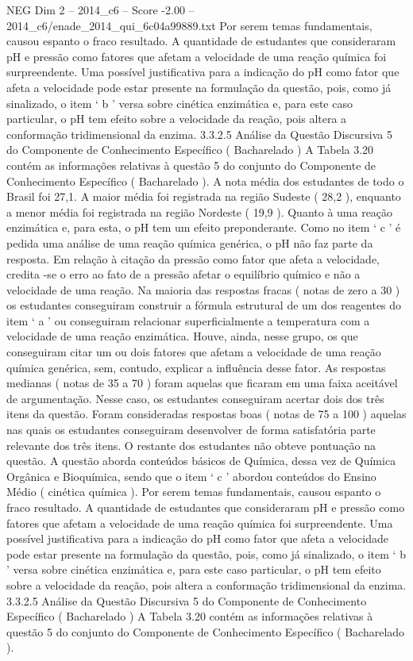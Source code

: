 \begin{textsample}{NEG Dim 2 – 2014\_c6 – Score -2.00 – 2014\_c6/enade\_2014\_qui\_6c04a99889.txt}
Por serem temas fundamentais, causou espanto o fraco resultado.
A quantidade de estudantes que consideraram pH e pressão como fatores que afetam a velocidade de uma reação química foi surpreendente.
Uma possível justificativa para a indicação do pH como fator que afeta a velocidade pode estar presente na formulação da questão, pois, como já sinalizado, o item ‘ b ’ versa sobre cinética enzimática e, para este caso particular, o pH tem efeito sobre a velocidade da reação, pois altera a conformação tridimensional da enzima. 3.3.2.5 Análise da Questão Discursiva 5 do Componente de Conhecimento Específico ( Bacharelado ) A Tabela 3.20 contém as informações relativas à questão 5 do conjunto do Componente de Conhecimento Específico ( Bacharelado ).
A nota média dos estudantes de todo o Brasil foi 27,1.
A maior média foi registrada na região Sudeste ( 28,2 ), enquanto a menor média foi registrada na região Nordeste ( 19,9 ).
Quanto à uma reação enzimática e, para esta, o pH tem um efeito preponderante.
Como no item ‘ c ’ é pedida uma análise de uma reação química genérica, o pH não faz parte da resposta.
Em relação à citação da pressão como fator que afeta a velocidade, credita -se o erro ao fato de a pressão afetar o equilíbrio químico e não a velocidade de uma reação.
Na maioria das respostas fracas ( notas de zero a 30 ) os estudantes conseguiram construir a fórmula estrutural de um dos reagentes do item ‘ a ’ ou conseguiram relacionar superficialmente a temperatura com a velocidade de uma reação enzimática.
Houve, ainda, nesse grupo, os que conseguiram citar um ou dois fatores que afetam a velocidade de uma reação química genérica, sem, contudo, explicar a influência desse fator.
As respostas medianas ( notas de 35 a 70 ) foram aquelas que ficaram em uma faixa aceitável de argumentação.
Nesse caso, os estudantes conseguiram acertar dois dos três itens da questão.
Foram consideradas respostas boas ( notas de 75 a 100 ) aquelas nas quais os estudantes conseguiram desenvolver de forma satisfatória parte relevante dos três itens.
O restante dos estudantes não obteve pontuação na questão.
A questão aborda conteúdos básicos de Química, dessa vez de Química Orgânica e Bioquímica, sendo que o item ‘ c ’ abordou conteúdos do Ensino Médio ( cinética química ).
Por serem temas fundamentais, causou espanto o fraco resultado.
A quantidade de estudantes que consideraram pH e pressão como fatores que afetam a velocidade de uma reação química foi surpreendente.
Uma possível justificativa para a indicação do pH como fator que afeta a velocidade pode estar presente na formulação da questão, pois, como já sinalizado, o item ‘ b ’ versa sobre cinética enzimática e, para este caso particular, o pH tem efeito sobre a velocidade da reação, pois altera a conformação tridimensional da enzima. 3.3.2.5 Análise da Questão Discursiva 5 do Componente de Conhecimento Específico ( Bacharelado ) A Tabela 3.20 contém as informações relativas à questão 5 do conjunto do Componente de Conhecimento Específico ( Bacharelado ).

\end{textsample}
